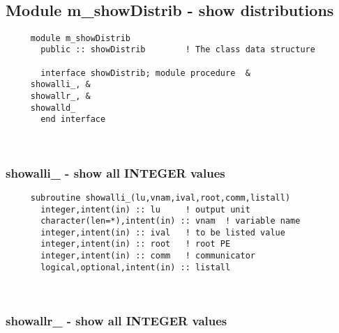  
\mbox{}\hrulefill\ 
 
  \subsection{Module m\_showDistrib - show distributions }

\begin{verbatim} 
     module m_showDistrib
       public :: showDistrib		! The class data structure
 
       interface showDistrib; module procedure	&
 	 showalli_,	&
 	 showallr_,	&
 	 showalld_
       end interface
 \end{verbatim}%
 
 
\mbox{}\hrulefill\ 

  \subsubsection{showalli\_ - show all INTEGER values}

\begin{verbatim} 
     subroutine showalli_(lu,vnam,ival,root,comm,listall)
       integer,intent(in) :: lu		! output unit
       character(len=*),intent(in) :: vnam	! variable name
       integer,intent(in) :: ival	! to be listed value
       integer,intent(in) :: root	! root PE
       integer,intent(in) :: comm	! communicator
       logical,optional,intent(in) :: listall
 \end{verbatim}%
 
 
\mbox{}\hrulefill\ 
 
  \subsubsection{showallr\_ - show all INTEGER values}

